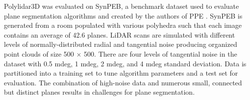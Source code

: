 Polylidar3D was evaluated on SynPEB, a benchmark dataset used to evaluate plane segmentation algorithms and created by the authors of PPE  \cite{schaefer_maximum_2019}. SynPEB is generated from a room populated with various polyhedra such that each image contains an average of 42.6 planes. LiDAR scans are simulated with different levels of normally-distributed radial and tangential noise producing organized point clouds of size 500 $\times$ 500. There are four levels of tangential noise in the dataset with 0.5 mdeg, 1 mdeg, 2 mdeg, and 4 mdeg standard deviation.  Data is partitioned into a training set to tune algorithm parameters and a test set for evaluation. The combination of high-noise data and numerous small, connected but distinct planes results in challenges for plane segmentation.%

